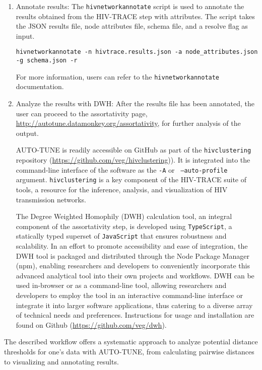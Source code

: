 \documentclass[utf8]{FrontiersinHarvard} %
\begin{document}
\begin{enumerate}
	      \item{ Annotate results: The {\tt hivnetworkannotate} script is used to annotate the results obtained from the HIV-TRACE step with attributes. The script takes the JSON results file, node attributes file, schema file, and a resolve flag as input.
	                  \begin{lstlisting}[style=BashInputStyle]
hivnetworkannotate -n hivtrace.results.json -a node_attributes.json -g schema.json -r
	\end{lstlisting}
	                  For more information, users can refer to the {\tt hivnetworkannotate}
	                  documentation. }

	      \item{ Analyze the results with DWH: After the results file has been annotated, the user can proceed to the assortativity page, \url{http://autotune.datamonkey.org/assortativity}, for further analysis of the output. }

	      AUTO-TUNE is readily accessible on GitHub as part of the {\tt hivclustering}
	      repository (\url{https://github.com/veg/hivclustering})). It is integrated into
	      the command-line interface of the software as the {\tt -A} or {\tt
			      --auto-profile} argument. {\tt hivclustering} is a key component of the
	      HIV-TRACE suite of tools, a resource for the inference, analysis, and
	      visualization of HIV transmission networks.

	      The Degree Weighted Homophily (DWH) calculation tool, an integral component of
	      the assortativity step, is developed using {\tt TypeScript}, a statically typed
	      superset of {\tt JavaScript} that ensures robustness and scalability. In an
	      effort to promote accessibility and ease of integration, the DWH tool is
	      packaged and distributed through the Node Package Manager (npm), enabling
	      researchers and developers to conveniently incorporate this advanced analytical
	      tool into their own projects and workflows. DWH can be used in-browser or as a
	      command-line tool, allowing researchers and developers to employ the tool in an
	      interactive command-line interface or integrate it into larger software
	      applications, thus catering to a diverse array of technical needs and
	      preferences. Instructions for usage and installation are found on Github
	      (\url{https://github.com/veg/dwh}).

\end{enumerate}

The described workflow offers a systematic approach to analyze potential
distance thresholds for one's data with AUTO-TUNE, from calculating pairwise
distances to visualizing and annotating results.
\end{document}

